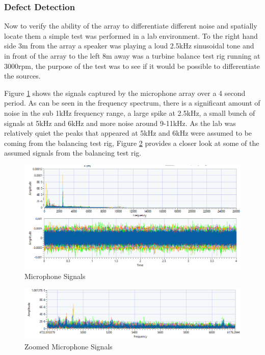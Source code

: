 \documentclass{UoNMCHA}
\numberwithin{equation}{section}
\begin{document}
\subsubsection{Defect Detection} \label{sec:Defect Detection Lab Testing}

    Now to verify the ability of the array to differentiate different noise and spatially locate them a simple test was performed in a lab environment. To the right hand side 3m from the array a speaker was playing a loud 2.5kHz sinusoidal tone and in front of the array to the left 8m away was a turbine balance test rig running at 3000rpm, the purpose of the test was to see if it would be possible to differentiate the sources.

    Figure \ref{fig:mic signals lab test} shows the signals captured by the microphone array over a 4 second period. As can be seen in the frequency spectrum, there is a significant amount of noise in the sub 1kHz frequency range, a large spike at 2.5kHz, a small bunch of signals at 5kHz and 6kHz and more noise around 9-11kHz. As the lab was relatively quiet the peaks that appeared at 5kHz and 6kHz were assumed to be coming from the balancing test rig, Figure \ref{fig:zoom mic signals lab test} provides a closer look at some of the assumed signals from the balancing test rig.
    
    \begin{figure} [H]
        \centering
        \includegraphics[keepaspectratio, width = \textwidth]{Figures/Raw Sound Waves.png}
        \caption{Microphone Signals}
        \label{fig:mic signals lab test}
    \end{figure}
    
    \begin{figure} [H]
        \centering
        \includegraphics[keepaspectratio, width = \textwidth]{Figures/Zoomed Sound Waves.png}
        \caption{Zoomed Microphone Signals}
        \label{fig:zoom mic signals lab test}
    \end{figure}
    
\end{document}
